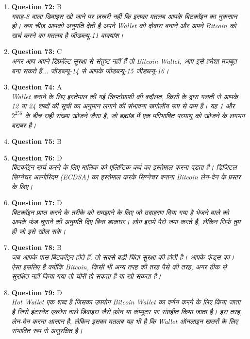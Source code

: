 \documentclass[12pt,a4paper]{article}
\begin{document}
\begin{enumerate}
\item \textbf{Question 72:} B
\\ \textit{गवाह-8 वाला डिवाइस खो जाने पर ज़रूरी नहीं कि इसका मतलब आपके बिटकॉइन का नुकसान हो। क्या चीज़ आपको अनुमति देती है अपने Wallet को दोबारा बनाने और अपने Bitcoin को खर्च करने का मतलब है जीडब्ल्यू-11 वाक्यांश।}

\item \textbf{Question 73:} C
\\ \textit{अगर आप अपने डिफ़ॉल्ट सुरक्षा से संतुष्ट नहीं हैं तो Bitcoin Wallet, आप इसे हमेशा मजबूत बना सकते हैं... जीडब्ल्यू-14 से आपके जीडब्ल्यू-15 जीडब्ल्यू-16।}

\item \textbf{Question 74:} A
\\ \textit{Wallet बनाने के लिए इस्तेमाल की गई क्रिप्टोग्राफी की बदौलत, किसी के द्वारा गलती से आपके 12 या 24 शब्दों की सूची का अनुमान लगाने की संभावना खगोलीय रूप से कम है। यह 1 और $2^256$ के बीच सही संख्या खोजने जैसा है, जो ब्रह्मांड में एक परिभाषित परमाणु को खोजने के लगभग बराबर है।}

\item \textbf{Question 75:} B

\item \textbf{Question 76:} D
\\ \textit{बिटकॉइन खर्च करने के लिए मालिक को एलिप्टिक कर्व का इस्तेमाल करना पड़ता है। डिजिटल सिग्नेचर अल्गोरिदम (ECDSA) का इस्तेमाल करके सिग्नेचर बनाना Bitcoin लेन-देन के प्रसार के लिए।}

\item \textbf{Question 77:} D
\\ \textit{बिटकॉइन प्राप्त करने के तरीके को समझाने के लिए जो उदाहरण दिया गया है भेजने वाले को आपके फंड चुराने की अनुमति दिए बिना डाकघर। लोग इसमें पैसे जमा करते हैं, लेकिन सिर्फ तुम ही जो इसे खोल सके।}

\item \textbf{Question 78:} B
\\ \textit{जब आपके पास बिटकॉइन होते हैं, तो सबसे बड़ी चिंता सुरक्षा की होती है। आपके फंड्स का। ऐसा इसलिए है क्योंकि Bitcoin, किसी भी अन्य तरह की तरह पैसे की तरह, अगर ठीक से सुरक्षित नहीं किया गया तो चोरी हो सकता है या खो सकता है।}

\item \textbf{Question 79:} D
\\ \textit{Hot Wallet एक शब्द है जिसका उपयोग Bitcoin Wallet का वर्णन करने के लिए किया जाता है जिसे इंटरनेट एक्सेस वाले डिवाइस जैसे फ़ोन या कंप्यूटर पर संग्रहीत किया जाता है। इस तरह, लेन-देन करना आसान है, लेकिन इसका मतलब यह भी है कि Wallet ऑनलाइन खतरों के लिए संभावित रूप से असुरक्षित है।}


\end{enumerate}
\end{document}
